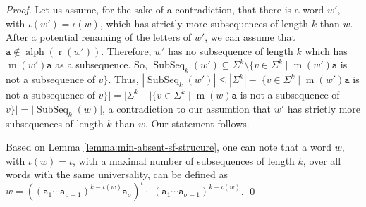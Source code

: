 \documentclass[runningheads,UKenglish,cleveref, autoref, thm-restate]{llncs}
\def\ta{\mathtt{a}}
\def\r{\operatorname{r}}
\def\m{\operatorname{m}}
\DeclareMathOperator{\al}{alph}
\DeclareMathOperator\ScatFact{SubSeq}
\begin{document}
\begin{proof}
Let us assume, for the sake of a contradiction, that there is a word $w'$, with $\iota(w')=\iota(w)$, which has strictly more subsequences of length $k$ than $w$. After a potential renaming of the letters of $w'$, we can assume that $\ta\notin \al(\r(w'))$. Therefore, $w'$ has no subsequence of length $k$ which has $\m(w')\ta$ as a subsequence. So, $\ScatFact_k(w')\subseteq \Sigma^k \setminus \{v\in \Sigma^k\mid \m(w')\ta$ is not a subsequence of $v\}$. Thus, $|\ScatFact_k(w')|\leq |\Sigma^k| - |\{v\in \Sigma^k\mid \m(w')\ta$ is not a subsequence of $v\}|=  |\Sigma^k| - |\{v\in \Sigma^k\mid \m(w)\ta$ is not a subsequence of $v\}|=|\ScatFact_k(w)|$, a contradiction to our assumtion that $w'$ has strictly more subsequences of length $k$ than $w$. Our statement follows. 

Based on Lemma \ref{lemma:min-absent-sf-strucure}, one can note that a word $w$, with $\iota(w)=\iota$, with a maximal number of subsequences of length $k$, over all words with the same universality, can be defined as $w=((\ta_1 \cdots \ta_{\sigma-1})^{k-\iota(w)} \ta_\sigma)^\iota \cdot$  $(\ta_1 \cdots \ta_{\sigma-1})^{k-\iota(w)}$. \qed
 \end{proof}

\fi
\end{document}
